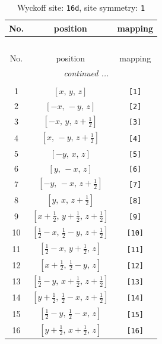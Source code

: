 \documentclass[fleqn,8pt]{jsarticle}
\begin{document}
\begin{longtable}{ccc}
\caption{Wyckoff site: {\tt 16d}, site symmetry: {\tt 1}}
 \\
 \hline \hline
No. & position & mapping \\ \hline \endfirsthead

\multicolumn{2}{l}{\tablename\ \thetable{}} \\
 \hline \hline
No. & position & mapping \\ \hline \endhead

 \hline \hline
\multicolumn{2}{r}{\footnotesize\it continued ...} \\ \endfoot

 \hline \hline
\multicolumn{2}{r}{} \\ \endlastfoot

1 & $\left[ x,\, y,\, z \right]$ & {\tt [1]} \\ \hline
2 & $\left[ - x,\, - y,\, z \right]$ & {\tt [2]} \\ \hline
3 & $\left[ - x,\, y,\, z + \frac{1}{2} \right]$ & {\tt [3]} \\ \hline
4 & $\left[ x,\, - y,\, z + \frac{1}{2} \right]$ & {\tt [4]} \\ \hline
5 & $\left[ - y,\, x,\, z \right]$ & {\tt [5]} \\ \hline
6 & $\left[ y,\, - x,\, z \right]$ & {\tt [6]} \\ \hline
7 & $\left[ - y,\, - x,\, z + \frac{1}{2} \right]$ & {\tt [7]} \\ \hline
8 & $\left[ y,\, x,\, z + \frac{1}{2} \right]$ & {\tt [8]} \\ \hline
9 & $\left[ x + \frac{1}{2},\, y + \frac{1}{2},\, z + \frac{1}{2} \right]$ & {\tt [9]} \\ \hline
10 & $\left[ \frac{1}{2} - x,\, \frac{1}{2} - y,\, z + \frac{1}{2} \right]$ & {\tt [10]} \\ \hline
11 & $\left[ \frac{1}{2} - x,\, y + \frac{1}{2},\, z \right]$ & {\tt [11]} \\ \hline
12 & $\left[ x + \frac{1}{2},\, \frac{1}{2} - y,\, z \right]$ & {\tt [12]} \\ \hline
13 & $\left[ \frac{1}{2} - y,\, x + \frac{1}{2},\, z + \frac{1}{2} \right]$ & {\tt [13]} \\ \hline
14 & $\left[ y + \frac{1}{2},\, \frac{1}{2} - x,\, z + \frac{1}{2} \right]$ & {\tt [14]} \\ \hline
15 & $\left[ \frac{1}{2} - y,\, \frac{1}{2} - x,\, z \right]$ & {\tt [15]} \\ \hline
16 & $\left[ y + \frac{1}{2},\, x + \frac{1}{2},\, z \right]$ & {\tt [16]} \\
\end{longtable}
\end{document}
